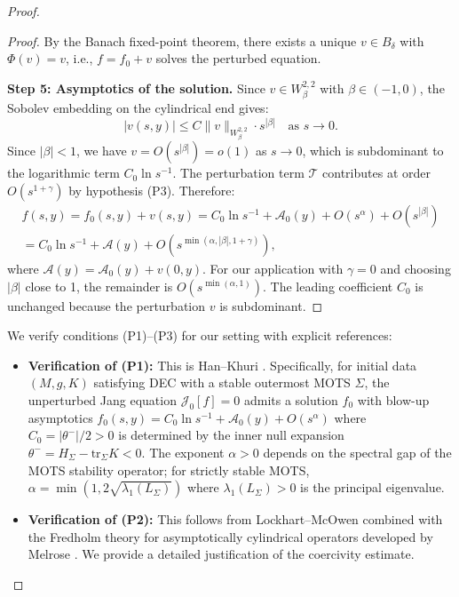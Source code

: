 \documentclass[12pt]{article}
\theoremstyle{plain}
\theoremstyle{definition}
\theoremstyle{remark}
\newcommand{\tr}{\mathrm{tr}}
\begin{document}
\begin{proof}
\begin{proof}
By the Banach fixed-point theorem, there exists a unique $v \in B_\delta$ with $\Phi(v) = v$, i.e., $f = f_0 + v$ solves the perturbed equation.

\textbf{Step 5: Asymptotics of the solution.}
Since $v \in W^{2,2}_\beta$ with $\beta \in (-1, 0)$, the Sobolev embedding on the cylindrical end gives:
\[
|v(s, y)| \leq C \|v\|_{W^{2,2}_\beta} \cdot s^{|\beta|} \quad \text{as } s \to 0.
\]
Since $|\beta| < 1$, we have $v = O(s^{|\beta|}) = o(1)$ as $s \to 0$, which is subdominant to the logarithmic term $C_0 \ln s^{-1}$. The perturbation term $\mathcal{T}$ contributes at order $O(s^{1+\gamma})$ by hypothesis (P3). Therefore:
\begin{multline}
f(s, y) = f_0(s, y) + v(s, y) = C_0 \ln s^{-1} + \mathcal{A}_0(y) + O(s^\alpha) + O(s^{|\beta|}) \\
= C_0 \ln s^{-1} + \mathcal{A}(y) + O(s^{\min(\alpha, |\beta|, 1+\gamma)}),
\end{multline}
where $\mathcal{A}(y) = \mathcal{A}_0(y) + v(0, y)$. For our application with $\gamma = 0$ and choosing $|\beta|$ close to 1, the remainder is $O(s^{\min(\alpha, 1)})$. The leading coefficient $C_0$ is unchanged because the perturbation $v$ is subdominant.
\end{proof}

We verify conditions (P1)--(P3) for our setting with explicit references:
\begin{itemize}
    \item \textbf{Verification of (P1):} This is Han--Khuri \cite[Proposition 4.5]{hankhuri2013}. Specifically, for initial data $(M,g,K)$ satisfying DEC with a stable outermost MOTS $\Sigma$, the unperturbed Jang equation $\mathcal{J}_0[f] = 0$ admits a solution $f_0$ with blow-up asymptotics $f_0(s,y) = C_0 \ln s^{-1} + \mathcal{A}_0(y) + O(s^\alpha)$ where $C_0 = |\theta^-|/2 > 0$ is determined by the inner null expansion $\theta^- = H_\Sigma - \tr_\Sigma K < 0$. The exponent $\alpha > 0$ depends on the spectral gap of the MOTS stability operator; for strictly stable MOTS, $\alpha = \min(1, 2\sqrt{\lambda_1(L_\Sigma)})$ where $\lambda_1(L_\Sigma) > 0$ is the principal eigenvalue.
    
    \item \textbf{Verification of (P2):} This follows from Lockhart--McOwen \cite[Theorem 7.4]{lockhartmccowen1985} combined with the Fredholm theory for asymptotically cylindrical operators developed by Melrose \cite[Chapter 5]{melrose1996}. We provide a detailed justification of the coercivity estimate.
    

\end{itemize}
\end{proof}
\end{document}
